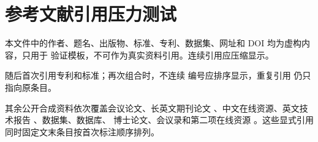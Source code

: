\documentclass{SZTUthesis}
\begin{document}
\setfooter

\section{参考文献引用压力测试}

本文件中的作者、题名、出版物、标准、专利、数据集、网址和 DOI 均为虚构内容，只用于
验证模板，不可作为真实资料引用。连续引用应压缩显示\cite{synthetic-article-cn,synthetic-book-en,synthetic-thesis-cn}。

随后首次引用专利和标准\cite{synthetic-patent-cn,synthetic-standard-cn}；再次组合时，不连续
编号应排序显示\cite{synthetic-standard-cn,synthetic-article-cn,synthetic-thesis-cn}，重复引用
仍只指向原条目\cite{synthetic-article-cn}。

其余公开合成资料依次覆盖会议论文\cite{synthetic-conference-en}、长英文期刊论文
\cite{synthetic-long-article-en}、中文在线资源\cite{synthetic-online-cn}、英文技术报告
\cite{synthetic-report-en}、数据集\cite{synthetic-dataset-en}、数据库\cite{synthetic-database-cn}、
博士论文\cite{synthetic-dissertation-en}、会议录\cite{synthetic-proceedings-cn}和第二项在线资源
\cite{synthetic-online-en}。这些显式引用同时固定文末条目按首次标注顺序排列。

\setcounter{secnumdepth}{-2}
\end{document}
